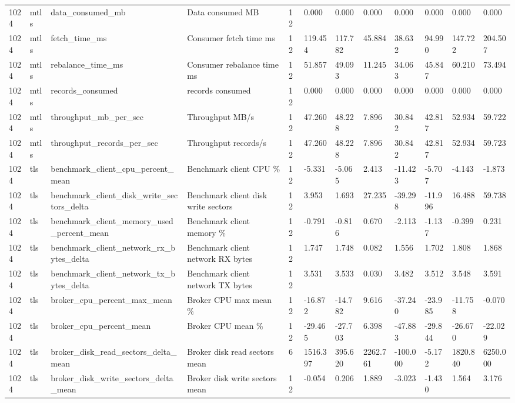 \begin{longtable}{llllllllllll}
1024 & mtls & data\_consumed\_mb & Data consumed MB & 12 & 0.000 & 0.000 & 0.000 & 0.000 & 0.000 & 0.000 & 0.000 \\
1024 & mtls & fetch\_time\_ms & Consumer fetch time ms & 12 & 119.454 & 117.782 & 45.884 & 38.632 & 94.990 & 147.722 & 204.507 \\
1024 & mtls & rebalance\_time\_ms & Consumer rebalance time ms & 12 & 51.857 & 49.093 & 11.245 & 34.063 & 45.847 & 60.210 & 73.494 \\
1024 & mtls & records\_consumed & records consumed & 12 & 0.000 & 0.000 & 0.000 & 0.000 & 0.000 & 0.000 & 0.000 \\
1024 & mtls & throughput\_mb\_per\_sec & Throughput MB/s & 12 & 47.260 & 48.228 & 7.896 & 30.842 & 42.817 & 52.934 & 59.722 \\
1024 & mtls & throughput\_records\_per\_sec & Throughput records/s & 12 & 47.260 & 48.228 & 7.896 & 30.842 & 42.817 & 52.934 & 59.723 \\
1024 & tls & benchmark\_client\_cpu\_percent\_mean & Benchmark client CPU \% & 12 & -5.331 & -5.065 & 2.413 & -11.423 & -5.707 & -4.143 & -1.873 \\
1024 & tls & benchmark\_client\_disk\_write\_sectors\_delta & Benchmark client disk write sectors & 12 & 3.953 & 1.693 & 27.235 & -39.298 & -11.996 & 16.488 & 59.738 \\
1024 & tls & benchmark\_client\_memory\_used\_percent\_mean & Benchmark client memory \% & 12 & -0.791 & -0.816 & 0.670 & -2.113 & -1.137 & -0.399 & 0.231 \\
1024 & tls & benchmark\_client\_network\_rx\_bytes\_delta & Benchmark client network RX bytes & 12 & 1.747 & 1.748 & 0.082 & 1.556 & 1.702 & 1.808 & 1.868 \\
1024 & tls & benchmark\_client\_network\_tx\_bytes\_delta & Benchmark client network TX bytes & 12 & 3.531 & 3.533 & 0.030 & 3.482 & 3.512 & 3.548 & 3.591 \\
1024 & tls & broker\_cpu\_percent\_max\_mean & Broker CPU max mean \% & 12 & -16.872 & -14.782 & 9.616 & -37.240 & -23.985 & -11.758 & -0.070 \\
1024 & tls & broker\_cpu\_percent\_mean & Broker CPU mean \% & 12 & -29.465 & -27.703 & 6.398 & -47.883 & -29.844 & -26.670 & -22.029 \\
1024 & tls & broker\_disk\_read\_sectors\_delta\_mean & Broker disk read sectors mean & 6 & 1516.397 & 395.620 & 2262.761 & -100.000 & -5.172 & 1820.840 & 6250.000 \\
1024 & tls & broker\_disk\_write\_sectors\_delta\_mean & Broker disk write sectors mean & 12 & -0.054 & 0.206 & 1.889 & -3.023 & -1.430 & 1.564 & 3.176 \\

\end{longtable}
